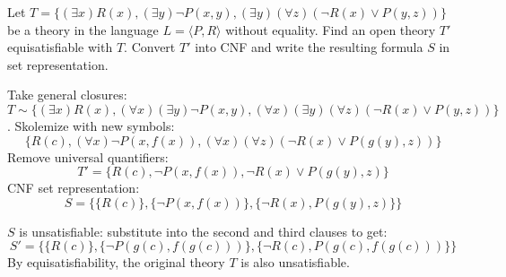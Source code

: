 \begin{problem}
    
    Let $T=\{(\exists x)R(x), (\exists y)\neg P(x,y), (\exists y)(\forall z)(\neg R(x)\vee P(y,z))\}$ be a theory in the language $L=\langle P,R\rangle$ without equality. Find an open theory $T'$ equisatisfiable with $T$. Convert $T'$ into CNF and write the resulting formula $S$ in set representation.

    \begin{solution}
        Take general closures:
        $T\sim\{(\exists x)R(x), (\forall x)(\exists y)\neg P(x,y), (\forall x)(\exists y)(\forall z)(\neg R(x)\vee P(y,z))\}$. Skolemize with new symbols:
        $$\{R(c), (\forall x)\neg P(x,f(x)), (\forall x)(\forall z)(\neg R(x)\vee P(g(y),z))\}$$
        Remove universal quantifiers:
        $$T'=\{R(c), \neg P(x,f(x)), \neg R(x)\vee P(g(y),z)\}$$
        CNF set representation:
        $$S=\{\{R(c)\},\{\neg P(x,f(x))\},\{\neg R(x),P(g(y),z)\}\}$$
        
        $S$ is unsatisfiable: substitute into the second and third clauses to get:
        $$
        S'=\{\{R(c)\},\{\neg P(g(c),f(g(c)))\},\{\neg R(c),P(g(c),f(g(c)))\}\}
        $$
        By equisatisfiability, the original theory $T$ is also unsatisfiable.        
    \end{solution}

\end{problem}


